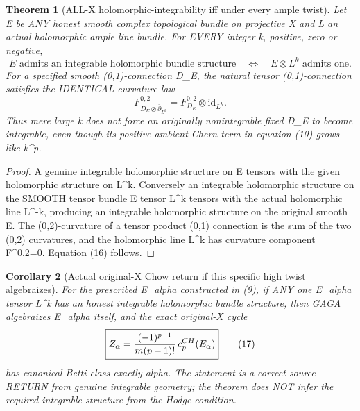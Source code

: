 \documentclass[11pt]{article}
\newtheorem{theorem}{Theorem}[section]
\newtheorem{corollary}[theorem]{Corollary}
\begin{document}
\begin{theorem}[ALL-X holomorphic-integrability iff under every ample twist]
Let E be ANY honest smooth
complex topological bundle
on projective X and L an
actual holomorphic ample
line bundle. For EVERY
integer k, positive,
zero or negative,
\[
 \boxed{
 E\text{ admits an integrable
 holomorphic bundle structure}
 \quad\Longleftrightarrow\quad
 E\otimes L^k\text{ admits one}.
 }                                                     \tag{15}
\]
For a specified smooth
(0,1)-connection D_E,
the natural tensor
(0,1)-connection satisfies
the IDENTICAL curvature law
\[
 \boxed{
 F^{0,2}_{D_E\otimes
             \bar\partial_{L^k}}
       =F^{0,2}_{D_E}
                   \otimes\mathrm{id}_{L^k}.
 }                                                     \tag{16}
\]
Thus mere large k does not
force an originally
nonintegrable fixed
D_E to become integrable,
even though its
positive ambient Chern
term in equation (10)
grows like k^p.
\end{theorem}
\begin{proof}
A genuine integrable
holomorphic structure
on E tensors with
the given holomorphic
structure on L^k.
Conversely an integrable
holomorphic structure
on the SMOOTH tensor
bundle E tensor L^k
tensors with the actual
holomorphic line L^{-k},
producing an integrable
holomorphic structure
on the original smooth E.
The (0,2)-curvature
of a tensor product
(0,1) connection is
the sum of the two
(0,2) curvatures,
and the holomorphic
line L^k has curvature
component F^{0,2}=0.
Equation (16) follows.
\end{proof}

\begin{corollary}[Actual original-X Chow return if this specific high twist algebraizes]
For the prescribed
E_alpha constructed
in (9), if ANY one
E_alpha tensor L^k
has an honest
integrable holomorphic
bundle structure,
then GAGA algebraizes
E_alpha itself, and
the exact original-X
cycle
\[
 \boxed{
 Z_\alpha=
 {(-1)^{p-1}\over
          m(p-1)!}\,
          c_p^{CH}(E_\alpha)
 }                                                     \tag{17}
\]
has canonical Betti class
exactly alpha.
The statement is a
correct source RETURN
from genuine integrable
geometry; the theorem
does NOT infer the
required integrable
structure from the
Hodge condition.
\end{corollary}
\end{document}
